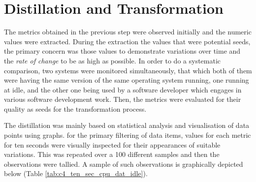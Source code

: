 \section{Distillation and Transformation}

The metrics obtained in the previous step were observed initially and the numeric values were extracted. During the extraction the values that were potential seeds, the primary concern was those values to demonstrate variations over time and the \textit{rate of change} to be as high as possible. In order to do a systematic comparison, two systems were monitored simultaneously, that which both of them were having the same version of the same operating system running, one running at idle, and the other one being used by a software developer which engages in various software development work. Then, the metrics were evaluated for their quality as seeds for the transformation process.

The distillation was mainly based on statistical analysis and visualisation of data points using graphs. for the primary filtering of data items, values for each metric for ten seconds were visually inspected for their appearances of suitable variations. This was repeated over a 100 different samples and then the observations were tallied. A sample of such observations is graphically depicted below (Table \ref{tab:c4_ten_sec_cpu_dat_idle}).

